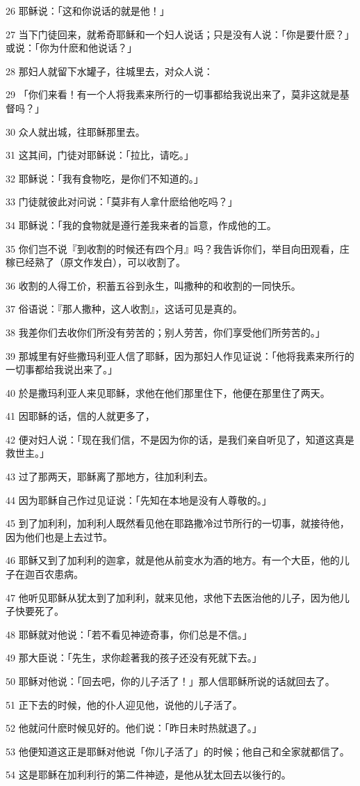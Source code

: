 \par 26 耶稣说：「这和你说话的就是他！」
\par 27 当下门徒回来，就希奇耶稣和一个妇人说话；只是没有人说：「你是要什麽？」或说：「你为什麽和他说话？」
\par 28 那妇人就留下水罐子，往城里去，对众人说：
\par 29 「你们来看！有一个人将我素来所行的一切事都给我说出来了，莫非这就是基督吗？」
\par 30 众人就出城，往耶稣那里去。
\par 31 这其间，门徒对耶稣说：「拉比，请吃。」
\par 32 耶稣说：「我有食物吃，是你们不知道的。」
\par 33 门徒就彼此对问说：「莫非有人拿什麽给他吃吗？」
\par 34 耶稣说：「我的食物就是遵行差我来者的旨意，作成他的工。
\par 35 你们岂不说『到收割的时候还有四个月』吗？我告诉你们，举目向田观看，庄稼已经熟了（原文作发白），可以收割了。
\par 36 收割的人得工价，积蓄五谷到永生，叫撒种的和收割的一同快乐。
\par 37 俗语说：『那人撒种，这人收割』，这话可见是真的。
\par 38 我差你们去收你们所没有劳苦的；别人劳苦，你们享受他们所劳苦的。」
\par 39 那城里有好些撒玛利亚人信了耶稣，因为那妇人作见证说：「他将我素来所行的一切事都给我说出来了。」
\par 40 於是撒玛利亚人来见耶稣，求他在他们那里住下，他便在那里住了两天。
\par 41 因耶稣的话，信的人就更多了，
\par 42 便对妇人说：「现在我们信，不是因为你的话，是我们亲自听见了，知道这真是救世主。」
\par 43 过了那两天，耶稣离了那地方，往加利利去。
\par 44 因为耶稣自己作过见证说：「先知在本地是没有人尊敬的。」
\par 45 到了加利利，加利利人既然看见他在耶路撒冷过节所行的一切事，就接待他，因为他们也是上去过节。
\par 46 耶稣又到了加利利的迦拿，就是他从前变水为酒的地方。有一个大臣，他的儿子在迦百农患病。
\par 47 他听见耶稣从犹太到了加利利，就来见他，求他下去医治他的儿子，因为他儿子快要死了。
\par 48 耶稣就对他说：「若不看见神迹奇事，你们总是不信。」
\par 49 那大臣说：「先生，求你趁著我的孩子还没有死就下去。」
\par 50 耶稣对他说：「回去吧，你的儿子活了！」那人信耶稣所说的话就回去了。
\par 51 正下去的时候，他的仆人迎见他，说他的儿子活了。
\par 52 他就问什麽时候见好的。他们说：「昨日未时热就退了。」
\par 53 他便知道这正是耶稣对他说「你儿子活了」的时候；他自己和全家就都信了。
\par 54 这是耶稣在加利利行的第二件神迹，是他从犹太回去以後行的。

